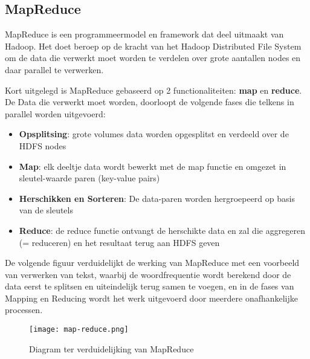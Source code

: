 \subsection{MapReduce}
MapReduce is een programmeermodel en framework dat deel uitmaakt van Hadoop. Het doet beroep op de kracht van het Hadoop Distributed File System om de data die verwerkt moet worden te verdelen over grote aantallen nodes en daar parallel te verwerken.\autocite{Talend2023}

Kort uitgelegd is MapReduce gebaseerd op 2 functionaliteiten: \textbf{map} en \textbf{reduce}.
\newline
\newline
De Data die verwerkt moet worden, doorloopt de volgende fases die telkens in parallel worden uitgevoerd:
\begin{itemize}
    \item \textbf{Opsplitsing}: grote volumes data worden opgesplitst en verdeeld over de HDFS nodes
    \item \textbf{Map}: elk deeltje data wordt bewerkt met de map functie en omgezet in sleutel-waarde paren (key-value pairs)
    \item \textbf{Herschikken en Sorteren}: De data-paren worden hergroepeerd op basis van de sleutels
    \item \textbf{Reduce}: de reduce functie ontvangt de herschikte data en zal die aggregeren (= reduceren) en het resultaat terug aan HDFS geven
\end{itemize}

De volgende figuur verduidelijkt de werking van MapReduce met een voorbeeld van verwerken van tekst, waarbij de woordfrequentie wordt berekend door de data eerst te splitsen en uiteindelijk terug samen te voegen, en in de fases van Mapping en Reducing wordt  het werk uitgevoerd door meerdere onafhankelijke processen.
\begin{figure}[H]
    \texttt{[image: map-reduce.png]}
    \caption{Diagram ter verduidelijking van MapReduce \autocite{Anushkakhatri2022}}
\end{figure}

